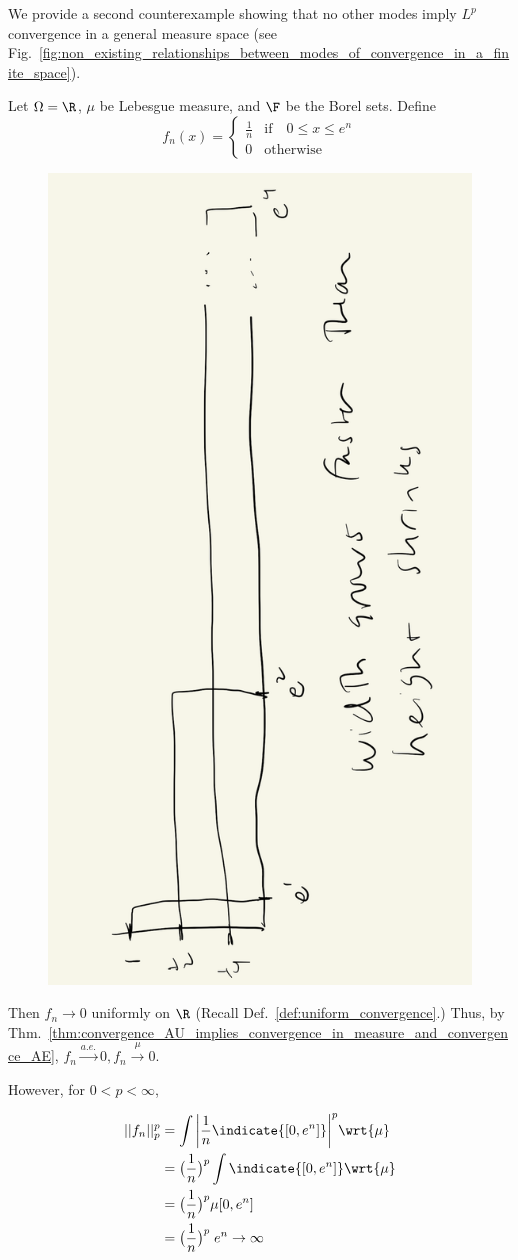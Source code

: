 \documentclass{article} %
\newcommand{\convergenceAE}{\stackrel{a.e.}{\to}}
\newcommand{\convergenceInMu}{\stackrel{\mu}{\to}}
\begin{document}
We provide a second counterexample showing that no other modes imply $L^p$ convergence in a general measure space (see Fig.~\ref{fig:non_existing_relationships_between_modes_of_convergence_in_a_finite_space}). 

Let $\Omega=\R$, $\mu$ be Lebesgue measure, and $\F$ be the Borel sets.  Define
\[f_n(x) =
\begin{cases}
\frac{1}{n} & \text{if} \quad 0 \leq x \leq e^n \\
0 & \text{otherwise}	
\end{cases}
 \]
 
\begin{figure}[H]
\centering
\includegraphics[width=.4\textwidth, angle=270]{images/modes_of_convergence_counter_example_2}	
\caption{}
\label{fig:modes_of_convergence_counter_example_2}	
\end{figure}

 Then $f_n \to 0$ uniformly on $\R$ {\tiny (Recall Def.~\ref{def:uniform_convergence}.)}  Thus, by Thm.~\ref{thm:convergence_AU_implies_convergence_in_measure_and_convergence_AE}, $f_n \convergenceAE 0, f_n \convergenceInMu 0$.
 
 However, for $0<p<\infty$,
 
 \begin{align*}
 ||f_n||_p^p &= \int \bigg| \frac{1}{n} \indicate{[0,e^n]} \bigg|^p \wrt{\mu} \\
 &= \big(\frac{1}{n}\big)^p \int \indicate{[0,e^n]}  \wrt{\mu} \\
 &= \big(\frac{1}{n}\big)^p \mu[0,e^n] \\
 &= \big(\frac{1}{n}\big)^p \; e^n \to \infty 
 \end{align*}
\end{document}
